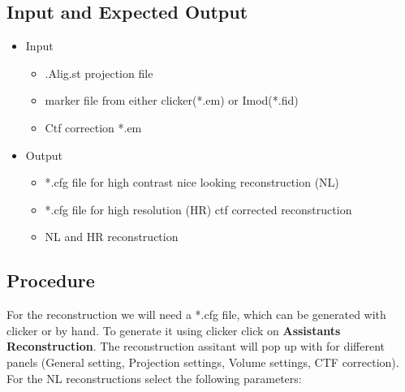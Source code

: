 \documentclass[12pt,a4paper]{scrartcl}
\begin{document}
{\subsection{Input and Expected Output}
\begin{itemize}
\item Input
\begin{itemize}
\item .Alig.st projection file
\item marker file from either clicker(*.em) or Imod(*.fid)
\item Ctf correction *.em
\end{itemize}
\item Output
\begin{itemize}
\item *.cfg file for high contrast nice looking reconstruction (NL)
\item *.cfg file for high resolution (HR) ctf corrected reconstruction 
\item NL and HR reconstruction  
\end{itemize} 
\end{itemize}

\subsection{Procedure}
For the reconstruction we will need a *.cfg file, which can be generated with clicker or by hand.  To generate it using clicker click on \textbf{Assistants} \textrightarrow{} \textbf{Reconstruction}. The reconstruction assitant will pop up with for different panels (General setting, Projection settings, Volume settings, CTF correction).\\

For the NL reconstructions select the following parameters:

}
\end{document}
